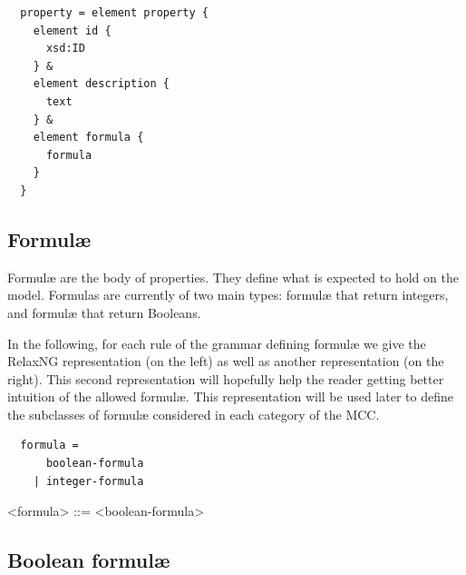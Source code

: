 \documentclass[10pt,english,a4paper]{article}
\begin{document}

\begin{lstlisting}
  property = element property {
    element id {
      xsd:ID
    } &
    element description {
      text
    } &
    element formula {
      formula
    }
  }
\end{lstlisting}


\subsection{Formul{\ae}}
Formul{\ae} are the body of properties.
They define what is expected to hold on the model.
Formulas are currently of two main types: formul{\ae} that return integers, and formul{\ae}
that return Booleans.

In the following, for each rule of the grammar defining formulæ we give the RelaxNG representation (on the left) as well as another representation (on the right). This second representation will hopefully help the reader getting better intuition of the allowed formulæ. This representation will be used later to define the subclasses of formulæ considered in each category of the MCC. 

\begin{multicols}{2}
\begin{lstlisting}
  formula =
      boolean-formula
    | integer-formula
\end{lstlisting}
\columnbreak
\begin{grammar}
<formula> ::= <boolean-formula>
\end{grammar}
\end{multicols}

\subsection{Boolean formul{\ae}}
\end{document}
